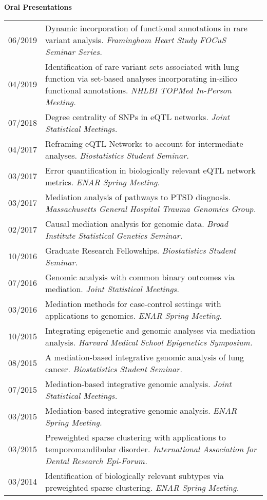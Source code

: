 \documentclass[10pt]{article}
\begin{document}
\textbf{Oral Presentations }  \setlength\intextsep{0mm}
\begin{center}
	\begin{table}[H]
		\centering
		\begin{tabular}{@{}p{2cm}@{}@{}p{14.9cm}@{}}
			06/2019  &  Dynamic incorporation of functional annotations in rare variant analysis. \textit{Framingham Heart Study FOCuS Seminar Series. }          \\ 
			04/2019  &  Identification of rare variant sets associated with lung function via set-based analyses incorporating in-silico functional annotations. \textit{NHLBI TOPMed In-Person Meeting. }          \\ 
			07/2018  & Degree centrality of SNPs in eQTL networks. \textit{Joint Statistical Meetings. }              \\ 
			04/2017  & Reframing eQTL Networks to account for intermediate analyses. \textit{Biostatistics Student Seminar. }\\
			03/2017  & Error quantification in biologically relevant eQTL network metrics. \textit{ENAR Spring Meeting.} \\
			03/2017  & Mediation analysis of pathways to PTSD diagnosis. \textit{Massachusetts General Hospital Trauma Genomics Group.} \\
			02/2017  & Causal mediation analysis for genomic data. \textit{Broad Institute Statistical Genetics Seminar.}  \\
			10/2016  & Graduate Research Fellowships. \textit{Biostatistics Student Seminar.} \\
			07/2016  & Genomic analysis with common binary outcomes via mediation. \textit{Joint Statistical Meetings.}\\
			03/2016  & Mediation methods for case-control settings with applications to genomics.\textit{ ENAR Spring Meeting.} \\
			10/2015  & Integrating epigenetic and genomic analyses via mediation analysis. \textit{Harvard Medical School Epigenetics Symposium. }\\
			08/2015  & A mediation-based integrative genomic analysis of lung cancer. \textit{Biostatistics Student Seminar. }\\
			07/2015  & Mediation-based integrative genomic analysis. \textit{Joint Statistical Meetings.} \\
			03/2015  & Mediation-based integrative genomic analysis. \textit{ENAR Spring Meeting.}\\
			03/2015  & Preweighted sparse clustering with applications to temporomandibular disorder. \textit{International Association for Dental Research Epi-Forum.} \\
			03/2014  & Identification of biologically relevant subtypes via preweighted sparse clustering. \textit{ENAR Spring Meeting.}
		\end{tabular}
	\end{table}
\end{center}
\end{document}
